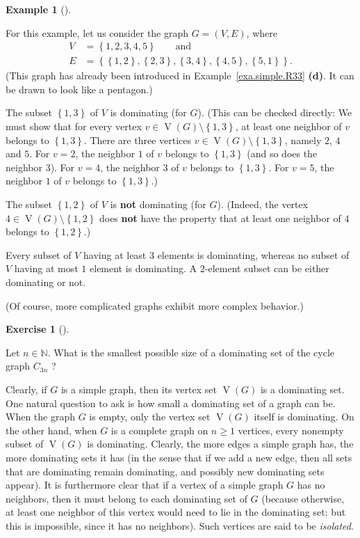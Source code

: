 \documentclass[numbers=enddot,12pt,final,onecolumn,notitlepage]{scrartcl}%
\theoremstyle{definition}
\newtheorem{exam}[theo]{Example}
\newenvironment{example}[1][]
{\begin{exam}[#1]\begin{leftbar}}
{\end{leftbar}\end{exam}}
\newtheorem{exmp}[theo]{Exercise}
\newenvironment{exercise}[1][]
{\begin{exmp}[#1]\begin{leftbar}}
{\end{leftbar}\end{exmp}}
\newcommand{\NN}{\mathbb{N}}
\newcommand{\set}[1]{\left\{ #1 \right\}}
\newcommand{\tup}[1]{\left( #1 \right)}
\newcommand{\verts}[1]{\operatorname{V}\left( #1 \right)}
\begin{document}
\begin{example} \label{exa.dominating.pentagon}
For this example, let us consider the graph $G = \tup{V, E}$, where
\begin{align*}
V &= \set{1, 2, 3, 4, 5} \qquad \text{and} \\
E &= \set{\set{1,2}, \set{2,3}, \set{3,4}, \set{4,5}, \set{5,1}} .
\end{align*}
(This graph has already been introduced in
Example~\ref{exa.simple.R33} \textbf{(d)}. It can be drawn to look
like a pentagon.)

The subset $\set{1, 3}$ of $V$ is dominating (for $G$). (This can be
checked directly: We must show that
for every vertex $v \in \verts{G} \setminus \set{1, 3}$, at least
one neighbor of $v$ belongs to $\set{1, 3}$. There are three vertices
$v \in \verts{G} \setminus \set{1, 3}$, namely $2$, $4$ and $5$. For
$v = 2$, the neighbor $1$ of $v$ belongs to $\set{1, 3}$ (and so does
the neighbor $3$). For $v = 4$, the neighbor $3$ of $v$ belongs to
$\set{1, 3}$. For $v = 5$, the neighbor $1$ of $v$ belongs to
$\set{1, 3}$.)

The subset $\set{1, 2}$ of $V$ is \textbf{not} dominating (for $G$).
(Indeed, the vertex $4 \in \verts{G} \setminus \set{1, 2}$ does
\textbf{not} have the property that at least one neighbor of $4$
belongs to $\set{1, 2}$.)

Every subset of $V$ having at least $3$ elements is dominating,
whereas no subset of $V$ having at most $1$ element is dominating.
A $2$-element subset can be either dominating or not.

(Of course, more complicated graphs exhibit more complex behavior.)
\end{example}

\begin{exercise}
Let $n \in \NN$. What is the smallest possible size of a dominating
set of the cycle graph $C_{3n}$ ?
\end{exercise}

Clearly, if $G$ is a simple graph, then its vertex set $\verts{G}$ is
a dominating set.
One natural question to ask is how small a dominating set of a graph
can be. When the graph $G$ is empty, only the vertex set $\verts{G}$
itself is dominating. On the other hand, when $G$ is a complete graph
on $n \geq 1$ vertices, every nonempty subset of $\verts{G}$ is
dominating. Clearly, the more edges a simple graph has, the more
dominating sets it has (in the sense that if we add a new edge, then
all sets that are dominating remain dominating, and possibly new
dominating sets appear). It is furthermore clear that if a vertex of
a simple graph $G$ has no neighbors, then it must belong to each
dominating set of $G$ (because otherwise, at least one neighbor of
this vertex would need to lie in the dominating set; but this is
impossible, since it has no neighbors). Such vertices are said to be
\textit{isolated}.
\end{document}
